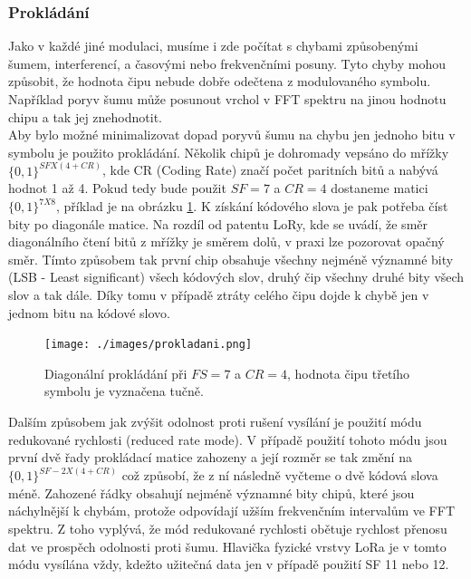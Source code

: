 \documentclass{ctuthesis}
\begin{document}
\subsubsection{Prokládání}
Jako v každé jiné modulaci, musíme i zde počítat s chybami způsobenými šumem, interferencí, a časovými nebo frekvenčními posuny. Tyto chyby mohou způsobit, že hodnota čipu nebude dobře odečtena z modulovaného symbolu. Například poryv šumu může posunout vrchol v FFT spektru na jinou hodnotu chipu a tak jej znehodnotit.\\
Aby bylo možné minimalizovat dopad poryvů šumu na chybu jen jednoho bitu v symbolu je použito prokládání. Několik chipů je dohromady vepsáno do mřížky $\{0,1\}^{SF X (4 + CR)}$, kde CR (Coding Rate) značí počet paritních bitů a nabývá hodnot 1 až 4. Pokud tedy bude použit $SF = 7$ a $CR =4$ dostaneme matici  $\{0,1\}^{7 X 8}$, příklad je na obrázku \ref{fig:lora1}. K získání kódového slova je pak potřeba číst bity po diagonále matice. Na rozdíl od patentu LoRy, kde se uvádí, že směr diagonálního čtení bitů z mřížky je směrem dolů, v praxi lze pozorovat opačný směr. Tímto způsobem tak první chip obsahuje všechny nejméně významné bity (LSB - Least significant) všech kódových slov, druhý čip všechny druhé bity všech slov a tak dále. Díky tomu v případě ztráty celého čipu dojde k chybě jen v jednom bitu na kódové slovo.\\
\begin{figure}
\caption{Diagonální prokládání při $FS=7$ a $CR =4$, hodnota čipu třetího symbolu je vyznačena tučně.   \cite{gr-lora2018}}
\texttt{[image: ./images/prokladani.png]}
\label{fig:lora1}
\end{figure}
Dalším způsobem jak zvýšit odolnost proti rušení vysílání je použití módu redukované rychlosti (reduced rate mode). V případě použití tohoto módu jsou první dvě řady prokládací matice zahozeny a její rozměr se tak změní na $\{0,1\}^{SF-2 X (4 + CR)}$ což způsobí, že z ní následně vyčteme o dvě kódová slova méně. Zahozené řádky obsahují nejméně významné bity chipů, které jsou náchylnější k chybám, protože odpovídají užším frekvenčním intervalům ve FFT spektru. Z toho vyplývá, že mód redukované rychlosti obětuje rychlost přenosu dat ve prospěch odolnosti proti šumu. Hlavička fyzické vrstvy LoRa je v tomto módu vysílána vždy, kdežto užitečná data jen v případě použití SF 11 nebo 12.
\end{document}
